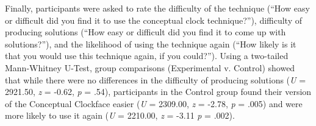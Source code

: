 \documentclass[english,man]{apa6}
\begin{document}
Finally, participants were asked to rate the difficulty of the technique
(\enquote{How easy or difficult did you find it to use the conceptual
clock technique?}), difficulty of producing solutions (\enquote{How easy
or difficult did you find it to come up with solutions?}), and the
likelihood of using the technique again (\enquote{How likely is it that
you would use this technique again, if you could?}). Using a two-tailed
Mann-Whitney U-Test, group comparisons (Experimental v. Control) showed
that while there were no differences in the difficulty of producing
solutions (\emph{U} = 2921.50, \emph{z} = -0.62, \emph{p} = .54),
participants in the Control group found their version of the Conceptual
Clockface easier (\emph{U} = 2309.00, \emph{z} = -2.78, \emph{p} = .005)
and were more likely to use it again (\emph{U} = 2210.00, \emph{z} =
-3.11 \emph{p} = .002).
\end{document}
